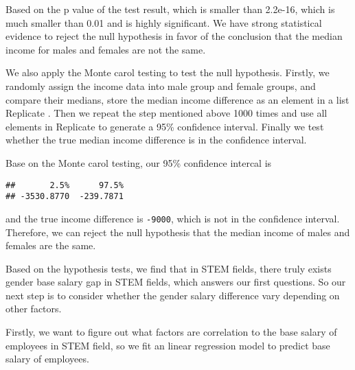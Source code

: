 \documentclass[
]{article}
\begin{document}
Based on the p value of the test result, which is smaller than 2.2e-16,
which is much smaller than 0.01 and is highly significant. We have
strong statistical evidence to reject the null hypothesis in favor of
the conclusion that the median income for males and females are not the
same.

We also apply the Monte carol testing to test the null hypothesis.
Firstly, we randomly assign the income data into male group and female
groups, and compare their medians, store the median income difference as
an element in a list Replicate . Then we repeat the step mentioned above
1000 times and use all elements in Replicate to generate a 95\%
confidence interval. Finally we test whether the true median income
difference is in the confidence interval.

Base on the Monte carol testing, our 95\% confidence intercal is

\begin{verbatim}
##       2.5%      97.5% 
## -3530.8770  -239.7871
\end{verbatim}

and the true income difference is \texttt{-9000}, which is not in the
confidence interval. Therefore, we can reject the null hypothesis that
the median income of males and females are the same.

Based on the hypothesis tests, we find that in STEM fields, there truly
exists gender base salary gap in STEM fields, which answers our first
questions. So our next step is to consider whether the gender salary
difference vary depending on other factors.

Firstly, we want to figure out what factors are correlation to the base
salary of employees in STEM field, so we fit an linear regression model
to predict base salary of employees.
\end{document}
